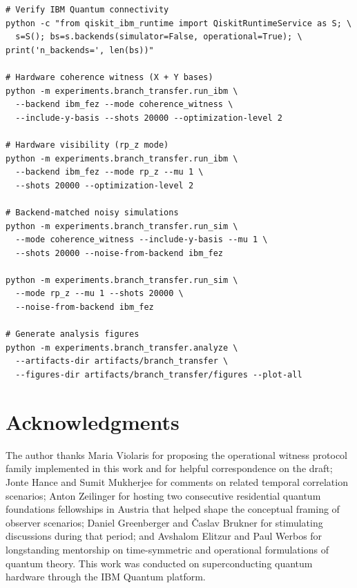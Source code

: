 \documentclass[11pt]{article}
\begin{document}
\begin{verbatim}
# Verify IBM Quantum connectivity
python -c "from qiskit_ibm_runtime import QiskitRuntimeService as S; \
  s=S(); bs=s.backends(simulator=False, operational=True); \
print('n_backends=', len(bs))"

# Hardware coherence witness (X + Y bases)
python -m experiments.branch_transfer.run_ibm \
  --backend ibm_fez --mode coherence_witness \
  --include-y-basis --shots 20000 --optimization-level 2

# Hardware visibility (rp_z mode)
python -m experiments.branch_transfer.run_ibm \
  --backend ibm_fez --mode rp_z --mu 1 \
  --shots 20000 --optimization-level 2

# Backend-matched noisy simulations
python -m experiments.branch_transfer.run_sim \
  --mode coherence_witness --include-y-basis --mu 1 \
  --shots 20000 --noise-from-backend ibm_fez

python -m experiments.branch_transfer.run_sim \
  --mode rp_z --mu 1 --shots 20000 \
  --noise-from-backend ibm_fez

# Generate analysis figures
python -m experiments.branch_transfer.analyze \
  --artifacts-dir artifacts/branch_transfer \
  --figures-dir artifacts/branch_transfer/figures --plot-all
\end{verbatim}
  \vspace*{2pt}%

\section*{Acknowledgments}

The author thanks Maria Violaris for proposing the operational witness protocol family implemented in this work and for helpful correspondence on the draft; Jonte Hance and Sumit Mukherjee for comments on related temporal correlation scenarios; Anton Zeilinger for hosting two consecutive residential quantum foundations fellowships in Austria that helped shape the conceptual framing of observer scenarios; Daniel Greenberger and \v{C}aslav Brukner for stimulating discussions during that period; and Avshalom Elitzur and Paul Werbos for longstanding mentorship on time-symmetric and operational formulations of quantum theory. This work was conducted on superconducting quantum hardware through the IBM Quantum platform.




\end{document}
